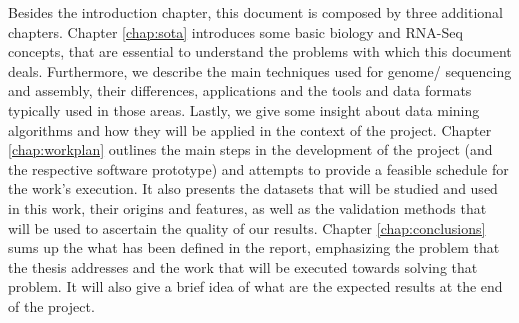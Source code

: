 Besides the introduction chapter, this document is composed by three additional
chapters. Chapter \ref{chap:sota} introduces some basic biology and RNA-Seq
concepts, that are essential to understand the problems with which this document
deals. Furthermore, we describe the main techniques used for genome/\trans{}
sequencing and assembly, their differences, applications and the tools and data
formats typically used in those areas. Lastly, we give some insight about data
mining algorithms and how they will be applied in the context of the project.
Chapter \ref{chap:workplan} outlines the main steps in the development of the
project (and the respective software prototype) and attempts to provide a
feasible schedule for the work's execution. It also presents the datasets that
will be studied and used in this work, their origins and features, as well as
the validation methods that will be used to ascertain the quality of our
results. Chapter \ref{chap:conclusions} sums up the what has been defined in the
report, emphasizing the problem that the thesis addresses and the work that will
be executed towards solving that problem. It will also give a brief idea of what
are the expected results at the end of the project.
